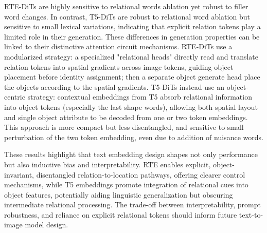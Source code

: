 \documentclass[10pt,twocolumn,letterpaper]{article}
\begin{document}
RTE-DiTs are highly sensitive to relational words ablation yet robust to filler word changes. In contrast, T5-DiTs are robust to relational word ablation but sensitive to small lexical variations, indicating that explicit relation tokens play a limited role in their generation. These differences in generation properties can be linked to their distinctive attention circuit mechanisms. RTE-DiTs use a modularized strategy: a specialized "relational heads" directly read and translate relation tokens into spatial gradients across image tokens, guiding object placement before identity assignment; then a separate object generate head place the objects according to the spatial gradients. T5-DiTs instead use an object-centric strategy: contextual embeddings from T5 absorb relational information into object tokens (especially the last shape words), allowing both spatial layout and single object attribute to be decoded from one or two token embeddings. 
This approach is more compact but less disentangled, and sensitive to small perturbation of the two token embedding, even due to addition of nuisance words. 



These results highlight that text embedding design shapes not only performance but also inductive bias and interpretability. 
RTE enables explicit, object-invariant, disentangled relation-to-location pathways, offering clearer control mechanisms, while T5 embeddings promote integration of relational cues into object features, potentially aiding linguistic generalization but obscuring intermediate relational processing. The trade-off between interpretability, prompt robustness, and reliance on explicit relational tokens should inform future text-to-image model design.
\end{document}
